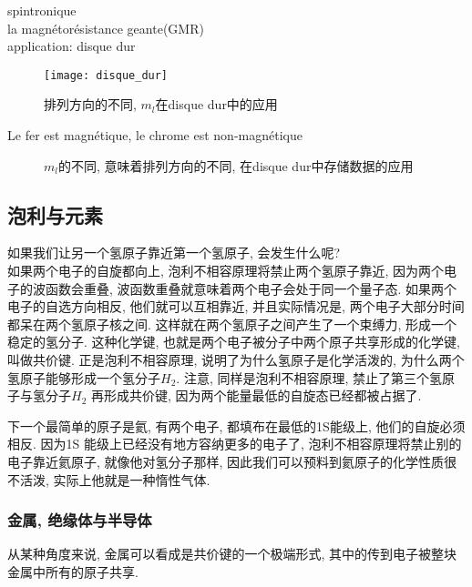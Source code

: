 \documentclass{article}
\begin{document}
spintronique\\
la magnétorésistance geante(GMR)\\
application: disque dur
\begin{figure}[!htbp]
		\centering
		\texttt{[image: disque\_dur]}
		\caption{排列方向的不同, $m_l$在disque dur中的应用}
		\label{fig.nombre_quantique.l_m}
\end{figure}

Le fer est magn\'etique, le chrome est non-magn\'etique
\begin{figure}[h!]
    \centering
    \hspace{7em} %
    \caption{$m_l$的不同, 意味着排列方向的不同, 在disque dur中存储数据的应用}
    \label{fig-sub}
\end{figure}

\subsection{泡利与元素}
如果我们让另一个氢原子靠近第一个氢原子, 会发生什么呢? \\
如果两个电子的自旋都向上, 泡利不相容原理将禁止两个氢原子靠近, 因为两个电子的波函数会重叠, 波函数重叠就意味着两个电子会处于同一个量子态.
如果两个电子的自选方向相反, 他们就可以互相靠近, 并且实际情况是, 两个电子大部分时间都呆在两个氢原子核之间.
这样就在两个氢原子之间产生了一个束缚力, 形成一个稳定的氢分子. 这种化学键, 也就是两个电子被分子中两个原子共享形成的化学键, 叫做共价键.
正是泡利不相容原理, 说明了为什么氢原子是化学活泼的, 为什么两个氢原子能够形成一个氢分子$H_2$.
注意, 同样是泡利不相容原理, 禁止了第三个氢原子与氢分子$H_2$ 再形成共价键, 因为两个能量最低的自旋态已经都被占据了.

下一个最简单的原子是氦, 有两个电子, 都填布在最低的1S能级上, 他们的自旋必须相反.
因为1S 能级上已经没有地方容纳更多的电子了, 泡利不相容原理将禁止别的电子靠近氦原子, 就像他对氢分子那样,
因此我们可以预料到氦原子的化学性质很不活泼, 实际上他就是一种惰性气体.

\subsubsection{金属, 绝缘体与半导体}
从某种角度来说, 金属可以看成是共价键的一个极端形式, 其中的传到电子被整块金属中所有的原子共享.
\end{document}
